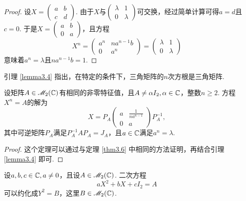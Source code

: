 \begin{proof}
  设$X=\begin{pmatrix}
    a & b \\
    c & d
  \end{pmatrix}$. 由于$X$与$\begin{pmatrix}
    \lambda & 1 \\
    0 & \lambda
  \end{pmatrix}$可交换，经过简单计算可得$a=d$且$c=0$. 于是$X=\begin{pmatrix}
    a & b \\
    0 & a
  \end{pmatrix}$，且方程
  \[
    X^n = \begin{pmatrix}
      a^n & na^{n-1}b \\
      0 & a^n
    \end{pmatrix} =
    \begin{pmatrix}
    \lambda & 1 \\
    0 & \lambda
  \end{pmatrix}
  \]
  意味着$a^n=\lambda$且$na^{n-1}b=1$.
\end{proof}

\begin{nota}
  引理 \ref{lemma3.4} 指出，在特定的条件下，三角矩阵的$n$次方根是三角矩阵.
\end{nota}

\begin{theorem}[当$X$有相同的非零特征值时的方程$X^n=A$.]

  设矩阵$A\in\mathscr M_2(\mathbb C)$有相同的非零特征值，且$A\ne \alpha I_2,\alpha\in\mathbb C$，整数$n\ge2$. 方程$X^n=A$的解为
  \[
    X = P_A \begin{pmatrix}
      a & \frac1{na^{n-1}} \\
      0 & a
    \end{pmatrix} P_A^{-1},
  \]
  其中可逆矩阵$P_A$满足$P_A^{-1}AP_A=J_A$，且$a\in\mathbb C$满足$a^n=\lambda$.
\end{theorem}

\begin{proof}
  这个定理可以通过与定理 \ref{thm3.6} 中相同的方法证明，再结合引理 \ref{lemma3.4} 即可.
\end{proof}

\begin{theorem}[一个特殊的二次方程.]

  设$a,b,c\in\mathbb C,a\ne0$，且设$A\in\mathscr M_2(\mathbb C)$. 二次方程
  \[
  aX^2 + bX + cI_2 = A
  \]
  可以约化成$Y^2=B$，这里$B\in\mathscr M_2(\mathbb C)$.
\end{theorem}

